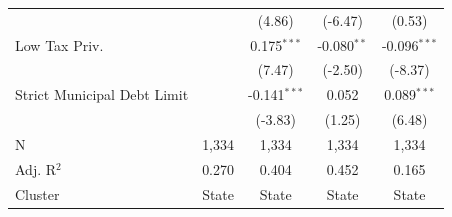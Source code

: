\begin{tabular*}{\textwidth}{@{\extracolsep{\fill}}lcccc}
                               &                & (4.86)        & (-6.47)       & (0.53)\\   
   Low Tax Priv.               &                & 0.175$^{***}$  & -0.080$^{**}$  & -0.096$^{***}$\\   
                               &                & (7.47)        & (-2.50)       & (-8.37)\\   
   Strict Municipal Debt Limit &                & -0.141$^{***}$ & 0.052          & 0.089$^{***}$\\   
                               &                & (-3.83)       & (1.25)        & (6.48)\\   
   \hline
   N                & 1,334          & 1,334          & 1,334          & 1,334\\  
   Adj. R$^2$              & 0.270          & 0.404          & 0.452          & 0.165\\  
   Cluster              & State & State & State & State\\  
   \bottomrule
\end{tabular*}
\par\endgroup
